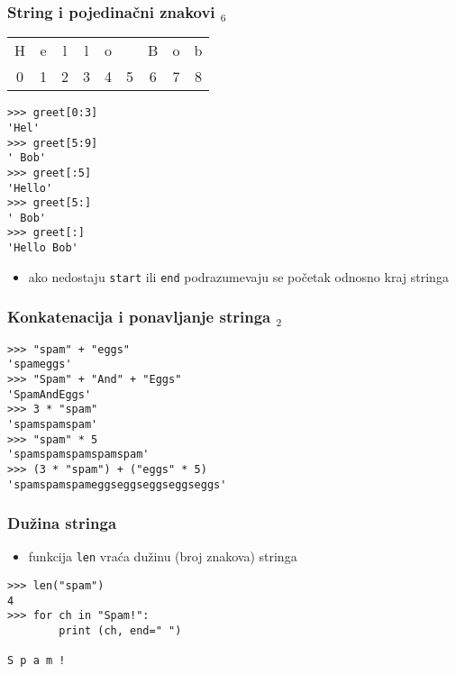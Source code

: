 \documentclass[utf8,compress]{beamer}
\begin{document}
\begin{frame}[fragile]
  \frametitle{String i pojedinačni znakovi $_6$}
\begin{tabular}{|c|c|c|c|c|c|c|c|c|}
\cline{1-9}
H & e & l & l & o & \  & B & o & b \\ \cline{1-9}
\multicolumn{1}{c}{0} & \multicolumn{1}{c}{1} & \multicolumn{1}{c}{2} & \multicolumn{1}{c}{3} & \multicolumn{1}{c}{4} & \multicolumn{1}{c}{5} & \multicolumn{1}{c}{6} & \multicolumn{1}{c}{7} & \multicolumn{1}{c}{8}
\end{tabular}
\begin{verbatim}
>>> greet[0:3]
'Hel'
>>> greet[5:9]
' Bob'
>>> greet[:5]
'Hello'
>>> greet[5:]
' Bob'
>>> greet[:]
'Hello Bob'
\end{verbatim}
  \begin{itemize}
    \item ako nedostaju \texttt{start} ili \texttt{end} podrazumevaju se početak odnosno kraj stringa
  \end{itemize}
\end{frame}


\begin{frame}[fragile]
  \frametitle{Konkatenacija i ponavljanje stringa $_2$}
\begin{verbatim}
>>> "spam" + "eggs"
'spameggs'
>>> "Spam" + "And" + "Eggs"
'SpamAndEggs'
>>> 3 * "spam"
'spamspamspam'
>>> "spam" * 5
'spamspamspamspamspam'
>>> (3 * "spam") + ("eggs" * 5)
'spamspamspameggseggseggseggseggs'
\end{verbatim}
\end{frame}

\begin{frame}[fragile]
  \frametitle{Dužina stringa}
  \begin{itemize}
    \item funkcija \texttt{len} vraća dužinu (broj znakova) stringa
  \end{itemize}
\begin{verbatim}
>>> len("spam")
4
>>> for ch in "Spam!":
        print (ch, end=" ")
	
S p a m !
\end{verbatim}
\end{frame}
\end{document}
